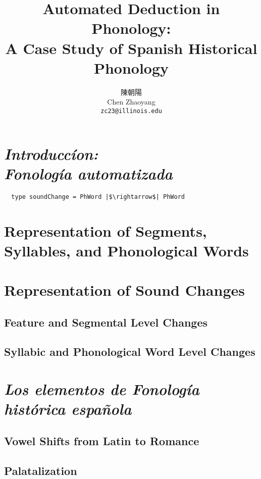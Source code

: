 \documentclass{article}[12pt]
\title{Automated Deduction in Phonology: \\ A Case Study of Spanish Historical Phonology}
\author{陳朝陽 \\ Chen Zhaoyang \\ \texttt{zc23@illinois.edu}}
\begin{document}
\maketitle

\begin{abstract}

\end{abstract}

\section{\emph{Introduccíon: \\ Fonología automatizada}}

\begin{verbatim}
  type soundChange = PhWord |$\rightarrow$| PhWord
\end{verbatim}

\section{Representation of Segments, Syllables, and Phonological Words}

\section{Representation of Sound Changes}

\subsection{Feature and Segmental Level Changes}

\subsection{Syllabic and Phonological Word Level Changes}

\section{\emph{Los elementos de Fonología histórica española}}

\subsection{Vowel Shifts from Latin to Romance}

\subsection{Palatalization}
\end{document}
